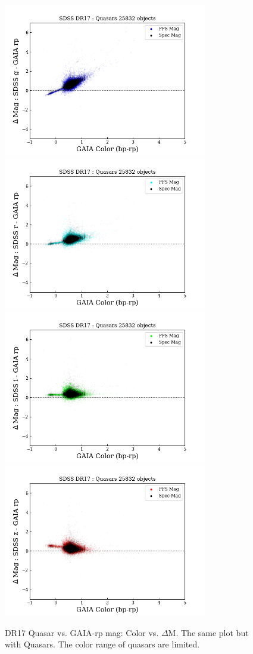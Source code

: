 \documentclass[apj,twocolumn]{aastex631}
\begin{document}
\begin{figure}%
\begin{center}
\includegraphics[angle=0,width=8.9cm]{figures/20220812_color_dmag_g_rp_dr17quasar.png}
\includegraphics[angle=0,width=8.9cm]{figures/20220812_color_dmag_r_rp_dr17quasar.png}
\includegraphics[angle=0,width=8.9cm]{figures/20220812_color_dmag_i_rp_dr17quasar.png}
\includegraphics[angle=0,width=8.9cm]{figures/20220812_color_dmag_z_rp_dr17quasar.png}
\caption{DR17 Quasar vs. GAIA-rp mag: Color vs. $\Delta$M.  The same plot but with Quasars.  The color range of quasars are limited.}
\end{center}
\end{figure}
\end{document}
